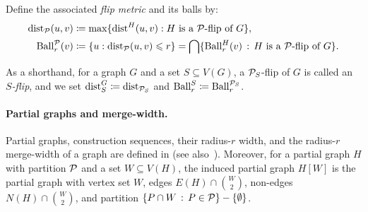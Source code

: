 Define the associated \emph{flip metric} and its balls by:
\begin{align*}
  \mathrm{dist}_\mathcal P(u,v)&\coloneqq
  \max\{\mathrm{dist}^H(u,v):H\text{ is a $\mathcal P$-flip of }G\},
  \\
  \operatorname{Ball}^\mathcal P_r(v)&\coloneqq\{u:\mathrm{dist}_\mathcal P(u,v)\leqslant r\}=\bigcap\{\operatorname{Ball}^H_r(v) \,:\, \text{$H$ is a $\mathcal P$-flip of $G$} \}.
\end{align*}

As a shorthand, for a graph $G$ and a set $S\subseteq V(G)$, a $\mathcal P_S$-flip of $G$ is called an \emph{$S$-flip}, and we set $\mathrm{dist}_S^G \coloneqq \mathrm{dist}_{\mathcal P_S}$ and $\operatorname{Ball}_r^S \coloneqq \operatorname{Ball}_r^{\mathcal P_S}$.


\paragraph{Partial graphs and merge-width.}
Partial graphs, construction sequences, their radius-$r$ width, and the radius-$r$ merge-width of a graph are defined in  (see also~\cite{mw-stoc}).
Moreover, for a partial graph $H$ with partition $\mathcal P$ and a set $W\subseteq V(H)$, the induced partial graph $H[W]$ is the partial graph with vertex set $W$,
edges $E(H)\cap \binom{W}{2}$, non-edges 
$N(H)\cap \binom{W}{2}$, and partition $\{P\cap W \,:\, P\in \mathcal P \}-\{\emptyset\}$.
